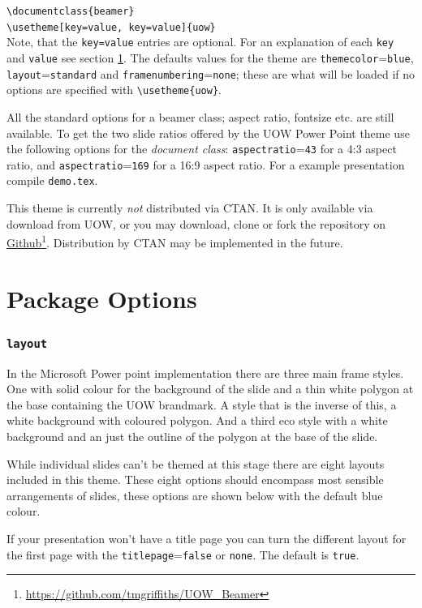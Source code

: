 \documentclass[a4paper,oneside,12pt]{article}
\newcommand{\key}[1]{\texttt{\color{UOWorange}#1}}
\newcommand{\val}[1]{\texttt{\color{UOWblue}#1}}
\newcommand{\command}[1]{\texttt{\color{UOWdarkgreen}#1}}
\begin{document}
\command{\textbackslash{}documentclass\{beamer\}}\\
\command{\textbackslash{}usetheme[\key{key}=\val{value}, \key{key}=\val{value}]\{uow\}}\\

Note, that the \command{\key{key}=\val{value}} entries are optional. For an explanation of each \key{key} and \val{value} see section \ref{sec:options}. The defaults values for the theme are \key{themecolor}=\val{blue}, \key{layout}=\val{standard} and \key{framenumbering}=\val{none}; these are what will be loaded if no options are specified with \command{\textbackslash{}usetheme\{uow\}}. 

All the standard options for a beamer class; aspect ratio, fontsize etc. are still available. To get the two slide ratios offered by the UOW Power Point theme use the following options for the \emph{document class}: \key{aspectratio}=\val{43} for a 4:3 aspect ratio, and \key{aspectratio}=\val{169} for a 16:9 aspect ratio. For a example presentation compile \texttt{demo.tex}.

This theme is currently \emph{not} distributed via CTAN. It is only available via download from UOW, or you may download, clone or fork the repository on \href{https://github.com/tmgriffiths/UOW_Beamer}{Github}\footnote{\url{https://github.com/tmgriffiths/UOW_Beamer}}. Distribution by CTAN may be implemented in the future.

\section{Package Options}\label{sec:options}
\subsubsection*{\key{layout}}%
In the Microsoft Power point implementation there are three main frame styles. One with solid colour for the background of the slide and a thin white polygon at the base containing the UOW brandmark. A style that is the inverse of this, a white background with coloured polygon. And a third eco style with a white background and an just the outline of the polygon at the base of the slide.

While individual slides can't be themed at this stage there are eight layouts included in this theme. These eight options should encompass most sensible arrangements of slides, these options are shown below with the default blue colour.

If your presentation won't have a title page you can turn the different layout for the first page with the \key{titlepage}=\val{false} or \val{none}. The default is \val{true}.
\end{document}
